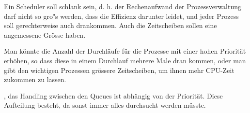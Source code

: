 \begin{answer}
  Ein Scheduler soll schlank  sein, d. h. der Rechenaufwand der Prozessverwaltung
  darf nicht so gro"s werden, dass die Effizienz darunter leidet, und jeder Prozess soll
  gerechterweise auch drankommen. Auch die Zeitscheiben sollen eine angemessene Grösse
  haben.
\end{answer}

\begin{answer}
  Man könnte die Anzahl der Durchläufe für die Prozesse mit einer hohen Priorität erhöhen,
  so dass diese in einem Durchlauf mehrere Male dran kommen, oder man gibt den wichtigen
  Prozessen grössere Zeitscheiben, um ihnen mehr CPU-Zeit zukommen zu lassen.
\end{answer}

\begin{answer}
  , das Handling zwischen den Queues ist abhängig von der Priorität. Diese
  Aufteilung besteht, da sonst immer alles durchsucht werden müsste.
\end{answer}


